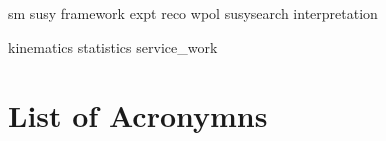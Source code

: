 \documentclass{mythesis}
\title{\mytitle}
\author{Alexander Sparrow}
\begin{document}

\begin{frontmatter}
  
\end{frontmatter}
\begin{mainmatter}
 
 {sm}
 {susy}
 {framework}
 {expt}
 {reco}
 {wpol}
 {susysearch}
 {interpretation}
 
\end{mainmatter}


\begin{comment}
  
  
  
  
  
  
  
  
\end{comment}

\begin{appendices}
 {kinematics}
 {statistics}
 {service_work}
 \chapter{List of Acronymns}
\end{appendices}

\begin{comment}
  
  
  
\end{comment}

\begin{backmatter}
  
\end{backmatter}

\end{document}
